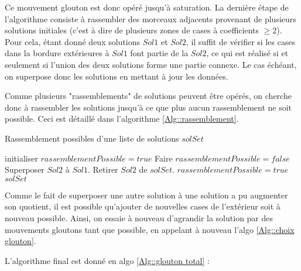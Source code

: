 \documentclass[12pt,a4paper]{article}
\begin{document}
\vspace{0.5cm}

Ce mouvement glouton est donc opéré jusqu'à saturation. 
La dernière étape de l'algorithme consiste à rassembler des morceaux adjacents provenant de plusieurs solutions initiales (c'est à dire de plusieurs zones de cases à coefficients $\geq 2$).
	Pour cela, étant donné deux solutions $Sol1$ et $Sol2$, il suffit de vérifier si les cases dans la bordure extérieures à $Sol1$ font partie de la $Sol2$, ce qui est réalisé si et seulement si l'union des deux solutions forme une partie connexe.
	Le cas échéant, on superpose donc les solutions en mettant à jour les données.
	
	Comme plusieurs "rassemblements" de solutions peuvent être opérés, on cherche donc à rassembler les solutions jusqu'à ce que plus aucun rassemblement ne soit possible. Ceci est détaillé dans l'algorithme \ref{Alg::rassemblement}.
	
	\begin{algorithm}
	\caption{Rassemblement possibles d'une liste de solutions $solSet$}
	\begin{algorithmic}[1]
	\STATE initialiser $rassemblementPossible =true$
		\STATE Faire $rassemblementPossible =false$
			\STATE Superposer $Sol2$ à $Sol1$.
			\STATE Retirer $Sol2$ de $solSet$.
			\STATE $rassemblementPossible =true$
		\ENDIF
	\ENDFOR
	\ENDWHILE
	 \RETURN $solSet$
	\end{algorithmic}
	 	\label{Alg::rassemblement}
\end{algorithm}

\vspace{0.5cm}

Comme le fait de superposer une autre solution à une solution a pu augmenter son quotient, il est possible qu'ajouter de nouvelles cases de l'extérieur soit à nouveau possible. Ainsi, on essaie à nouveau d'agrandir la solution par des mouvements gloutons tant que possible, en appelant à nouveau l'algo \ref{Alg::choix glouton}.

\vspace{0.5cm}

L'algorithme final est donné en algo \ref{Alg::glouton total} :
\end{document}
